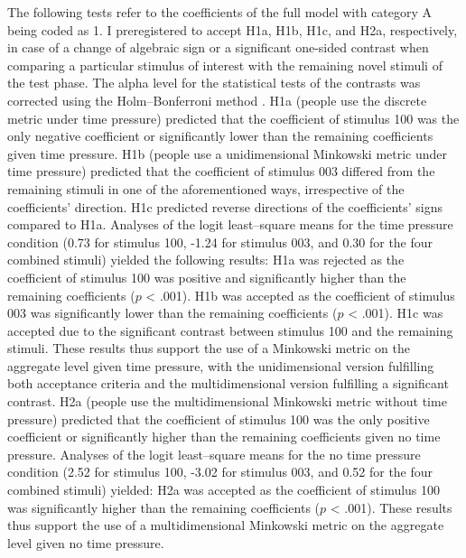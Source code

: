\documentclass[a4paper,man,natbib]{apa6}
\begin{document}
The following tests refer to the coefficients of the full model with category A being coded as 1. I preregistered to accept H1a, H1b, H1c, and H2a, respectively, in case of a change of algebraic sign or a significant one-sided contrast when comparing a particular stimulus of interest with the remaining novel stimuli of the test phase. The alpha level for the statistical tests of the contrasts was corrected using the Holm--Bonferroni method \citep{holm1979simple}. H1a (people use the discrete metric under time pressure) predicted that the coefficient of stimulus 100 was the only negative coefficient or significantly lower than the remaining coefficients given time pressure. H1b (people use a unidimensional Minkowski metric under time pressure) predicted that the coefficient of stimulus 003 differed from the remaining stimuli in one of the aforementioned ways, irrespective of the coefficients' direction. H1c predicted reverse directions of the coefficients' signs compared to H1a. Analyses of the logit least--square means for the time pressure condition (0.73 for stimulus 100, -1.24 for stimulus 003, and 0.30 for the four combined stimuli) yielded the following results: H1a was rejected as the coefficient of stimulus 100 was positive and significantly higher than the remaining coefficients ($p$ < .001). H1b was accepted as the coefficient of stimulus 003 was significantly lower than the remaining coefficients ($p$ < .001). H1c was accepted due to the significant contrast between stimulus 100 and the remaining stimuli. These results thus support the use of a Minkowski metric on the aggregate level given time pressure, with the unidimensional version fulfilling both acceptance criteria and the multidimensional version fulfilling a significant contrast. H2a (people use the multidimensional Minkowski metric without time pressure) predicted that the coefficient of stimulus 100 was the only positive coefficient or significantly higher than the remaining coefficients given no time pressure. Analyses of the logit least--square means for the no time pressure condition (2.52 for stimulus 100, -3.02 for stimulus 003, and 0.52 for the four combined stimuli) yielded: H2a was accepted as the coefficient of stimulus 100 was significantly higher than the remaining coefficients ($p$ < .001). These results thus support the use of a multidimensional Minkowski metric on the aggregate level given no time pressure.
\end{document}
